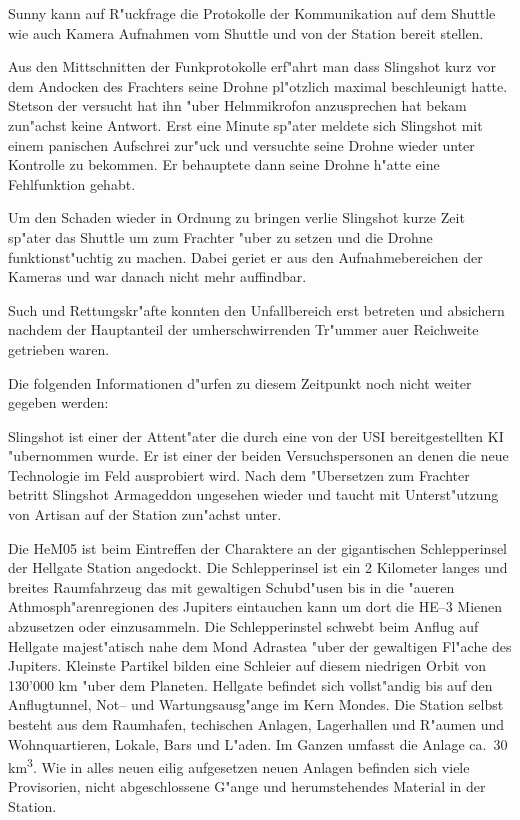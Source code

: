 Sunny kann auf R"uckfrage die Protokolle der Kommunikation auf dem Shuttle wie auch Kamera Aufnahmen vom Shuttle und von der Station bereit stellen.

Aus den Mittschnitten der Funkprotokolle erf"ahrt man dass Slingshot kurz vor dem Andocken des Frachters seine Drohne pl"otzlich maximal beschleunigt hatte. Stetson der versucht hat ihn "uber Helmmikrofon anzusprechen hat bekam zun"achst keine Antwort. Erst eine Minute sp"ater meldete sich Slingshot mit einem panischen Aufschrei zur"uck und versuchte seine Drohne wieder unter Kontrolle zu bekommen. Er behauptete dann seine Drohne h"atte eine Fehlfunktion gehabt.

Um den Schaden wieder in Ordnung zu bringen verlie\3 Slingshot kurze Zeit sp"ater das Shuttle um zum Frachter "uber zu setzen und die Drohne funktionst"uchtig zu machen. Dabei geriet er aus den Aufnahmebereichen der Kameras und war danach nicht mehr auffindbar.

Such und Rettungskr"afte konnten den Unfallbereich erst betreten und absichern nachdem der Hauptanteil der umherschwirrenden Tr"ummer au\3er Reichweite getrieben waren.



\begin{remarks}
	Die folgenden Informationen d"urfen zu diesem Zeitpunkt noch nicht weiter gegeben werden:
	
	Slingshot ist einer der Attent"ater die durch eine von der USI bereitgestellten KI "ubernommen wurde. Er ist einer der beiden Versuchspersonen an denen die neue Technologie im Feld ausprobiert wird. Nach dem "Ubersetzen zum Frachter betritt Slingshot Armageddon ungesehen wieder und taucht mit Unterst"utzung von Artisan auf der Station zun"achst unter.
\end{remarks}


Die HeM05 ist beim Eintreffen der Charaktere an der gigantischen Schlepperinsel der Hellgate Station angedockt. Die Schlepperinsel ist ein 2 Kilometer langes und breites Raumfahrzeug das mit gewaltigen Schubd"usen bis in die "au\3eren Athmosph"arenregionen des Jupiters eintauchen kann um dort die HE--3 Mienen abzusetzen oder einzusammeln. Die Schlepperinstel schwebt beim Anflug auf Hellgate majest"atisch nahe dem Mond Adrastea "uber der gewaltigen Fl"ache des Jupiters. Kleinste Partikel bilden eine Schleier auf diesem niedrigen Orbit von 130'000 km "uber dem Planeten. Hellgate befindet sich vollst"andig bis auf den Anflugtunnel, Not-- und Wartungsausg"ange im Kern  Mondes. Die Station selbst besteht aus dem Raumhafen, techischen Anlagen, Lagerhallen und R"aumen und Wohnquartieren, Lokale, Bars und L"aden. Im Ganzen umfasst die Anlage ca.~30 km\textsuperscript{3}. Wie in alles neuen eilig aufgesetzen neuen Anlagen befinden sich viele Provisorien, nicht abgeschlossene G"ange und herumstehendes Material in der Station.

